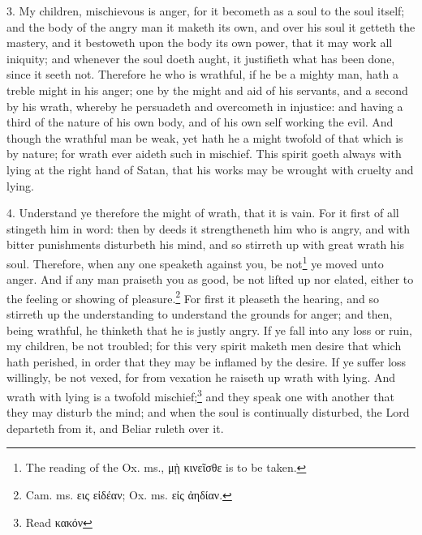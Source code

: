 3. My children, mischievous is anger, for it becometh as a soul to the soul itself; and the body of the angry man it maketh its own, and over his soul it getteth the mastery, and it bestoweth upon the body its own power, that it may work all iniquity; and whenever the soul doeth aught, it justifieth what has been done, since it seeth not. Therefore he who is wrathful, if he be a mighty man, hath a treble might in his anger; one by the might and aid of his servants, and a second by his wrath, whereby he persuadeth and overcometh in injustice: and having a third of the nature of his own body, and of his own self working the evil. And though the wrathful man be weak, yet hath he a might twofold of that which is by nature; for wrath ever aideth such in mischief. This spirit goeth always with lying at the right hand of Satan, that his works may be wrought with cruelty and lying.

4. Understand ye therefore the might of wrath, that it is vain. For it first of all stingeth him in word: then by deeds it strengtheneth him who is angry, and with bitter punishments disturbeth his mind, and so stirreth up with great wrath his soul. Therefore, when any one speaketh against you, be not\footnote{The reading of the Ox. ms., \textgreek{μῂ κινεῖσθε} is to be taken.} ye moved unto anger. And if any man praiseth you as good, be not lifted up nor elated, either to the feeling or showing of pleasure.\footnote{Cam. ms. \textgreek{εις εἰδέαν}; Ox. ms. \textgreek{εἰς ἀηδίαν}.} For first it pleaseth the hearing, and so stirreth up the understanding to understand the grounds for anger; and then, being wrathful, he thinketh that he is justly angry. If ye fall into any loss or ruin, my children, be not troubled; for this very spirit maketh men desire that which hath perished, in order that they may be inflamed by the desire. If ye suffer loss willingly, be not vexed, for from vexation he raiseth up wrath with lying. And wrath with lying is a twofold mischief;\footnote{Read \textgreek{κακόν}} and they speak one with another that they may disturb the mind; and when the soul is continually disturbed, the Lord departeth from it, and Beliar ruleth over it.


